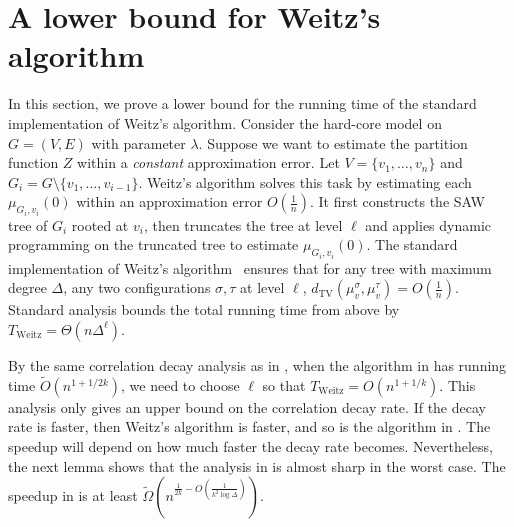 \documentclass[11pt,a4paper]{amsart}
\makeatletter
\theoremstyle{definition}
\theoremstyle{remark}
\def\listtodoname{Todo list}
\def\listoftodos{\@starttoc{tdo}\listtodoname}
\newcommand{\dTV}{d_{\mathrm{TV}}}
\makeatother
\begin{document}

\section{A lower bound for Weitz's algorithm}\label{sec:lb-Weitz}

In this section, we prove a lower bound for the running time of the standard implementation of Weitz's algorithm.
Consider the hard-core model on $G=(V,E)$ with parameter $\lambda$.
Suppose we want to estimate the partition function $Z$ within a \emph{constant} approximation error.
Let $V=\{v_1,\ldots,v_n\}$ and $G_i = G\setminus \{v_1,\ldots,v_{i-1}\}$.
Weitz's algorithm solves this task by estimating each $\mu_{G_i,v_i}(0)$ within an approximation error $ O(\frac{1}{n})$.  
It first constructs the SAW tree of $G_i$ rooted at $v_i$, then truncates the tree at level $\ell$ and applies dynamic programming on the truncated tree to estimate $\mu_{G_i,v_i}(0)$.
The standard implementation of Weitz's algorithm~\cite{Wei06,LLY13} ensures that for any tree with maximum degree $\Delta$, any two configurations $\sigma,\tau$ at level $\ell$, $\dTV(\mu_v^{\sigma},\mu_v^{\tau}) = O(\frac{1}{n})$. 
Standard analysis bounds the total running time from above by $T_{\mathrm{Weitz}} = \Theta(n \Delta^\ell)$.

By the same correlation decay analysis as in ,
when the algorithm in  has running time $\widetilde{O}(n^{1+1/2k})$,
we need to choose $\ell$ so that $T_{\mathrm{Weitz}}=O(n^{1+1/k})$.
This analysis only gives an upper bound on the correlation decay rate.
If the decay rate is faster, then Weitz's algorithm is faster,
and so is the algorithm in .
The speedup will depend on how much faster the decay rate becomes.
Nevertheless, the next lemma shows that the analysis in  is almost sharp in the worst case.
The speedup in  is at least $\widetilde{\Omega}\left(n^{\frac{1}{2k}-O(\frac{1}{k^2\log\Delta})}\right)$.

\end{document}
